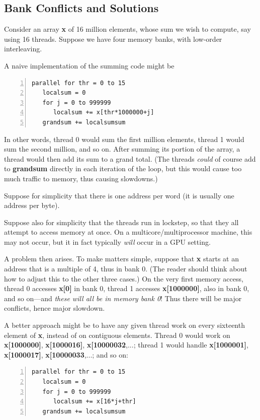 \subsection{Bank Conflicts and Solutions}
\label{bankclash}

Consider an array {\bf x} of 16 million elements, whose sum we wish to
compute, say using 16 threads.  Suppose we have four memory banks, with
low-order interleaving. 

A naive implementation of the summing code might be

\begin{Verbatim}[fontsize=\relsize{-2},numbers=left]
parallel for thr = 0 to 15
   localsum = 0
   for j = 0 to 999999
      localsum += x[thr*1000000+j]
   grandsum += localsumsum
\end{Verbatim}

In other words, thread 0 would sum the first million elements, thread 1
would sum the second million, and so on.  After summing its portion of
the array, a thread would then add its sum to a grand total.  (The
threads {\it could} of course add to {\bf grandsum} directly in each
iteration of the loop, but this would cause too much traffic to memory,
thus causing slowdowns.)

Suppose for simplicity that there is one address per word (it is usually
one address per byte).

Suppose also for simplicity that the threads run in lockstep, so that they
all attempt to access memory at once.  On a multicore/multiprocessor
machine, this may not occur, but it in fact typically {\it will} occur
in a GPU setting.

A problem then arises.  To make matters simple, suppose that {\bf x}
starts at an address that is a multiple of 4, thus in bank 0.  (The
reader should think about how to adjust this to the other three cases.)
On the very first memory access, thread 0 accesses {\bf x[0]} in bank 0,
thread 1 accesses {\bf x[1000000]}, also in bank 0, and so on---and {\it
these will all be in memory bank 0}!  Thus there will be major
conflicts, hence major slowdown.

A better approach might be to have any given thread work on every
sixteenth element of {\bf x}, instead of on contiguous elements.  Thread
0 would work on {\bf x[1000000]}, {\bf x[1000016]}, {\bf
x[10000032},...; thread 1 would handle {\bf x[1000001]}, {\bf
x[1000017]}, {\bf x[10000033},...; and so on:

\begin{Verbatim}[fontsize=\relsize{-2},numbers=left]
parallel for thr = 0 to 15
   localsum = 0
   for j = 0 to 999999
      localsum += x[16*j+thr]
   grandsum += localsumsum
\end{Verbatim}

